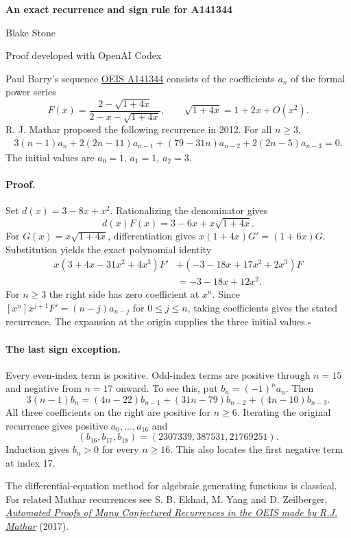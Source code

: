 \documentclass[11pt,letterpaper]{article}
\begin{document}
\begin{center}
{\LARGE\bfseries An exact recurrence and sign rule for A141344}\par\vspace{9pt}
Blake Stone\par{\small Proof developed with OpenAI Codex}
\end{center}
Paul Barry's sequence \href{https://oeis.org/A141344}{OEIS A141344} consists of the coefficients $a_n$ of the formal power series
\[
 F(x)=\frac{2-\sqrt{1+4x}}{2-x-\sqrt{1+4x}},\qquad \sqrt{1+4x}=1+2x+O(x^2).
\]
R. J. Mathar proposed the following recurrence in 2012. For all $n\ge3$,
\[
\begin{aligned}
 3(n-1)a_n+2(2n-11)a_{n-1}
    +(79-31n)a_{n-2}+2(2n-5)a_{n-3}=0.
\end{aligned}
\]
The initial values are $a_0=1$, $a_1=1$, $a_2=3$.

\paragraph{Proof.} Set $d(x)=3-8x+x^2$. Rationalizing the denominator gives
\[
 d(x)F(x)=3-6x+x\sqrt{1+4x}.
\]
For $G(x)=x\sqrt{1+4x}$, differentiation gives $x(1+4x)G'=(1+6x)G$. Substitution yields the exact polynomial identity
\[
\begin{aligned}
 x(3+4x-31x^2+4x^3)F' &+(-3-18x+17x^2+2x^3)F\\
   &=-3-18x+12x^2 .
\end{aligned}
\]
For $n\ge3$ the right side has zero coefficient at $x^n$. Since $[x^n]x^{j+1}F'=(n-j)a_{n-j}$ for $0\le j\le n$, taking coefficients gives the stated recurrence. The expansion at the origin supplies the three initial values.\hfill$\square$

\paragraph{The last sign exception.} Every even-index term is positive. Odd-index terms are positive through $n=15$ and negative from $n=17$ onward. To see this, put $b_n=(-1)^n a_n$. Then
\[
 3(n-1)b_n=(4n-22)b_{n-1}+(31n-79)b_{n-2}+(4n-10)b_{n-3}.
\]
All three coefficients on the right are positive for $n\ge6$. Iterating the original recurrence gives positive $a_0,\ldots,a_{16}$ and
\[
 (b_{16},b_{17},b_{18})=(2307339,387531,21769251).
\]
Induction gives $b_n>0$ for every $n\ge16$. This also locates the first negative term at index 17.

\vfill
\small The differential-equation method for algebraic generating functions is classical. For related Mathar recurrences see S. B. Ekhad, M. Yang and D. Zeilberger, \href{https://sites.math.rutgers.edu/~zeilberg/mamarim/mamarimhtml/mathar.html}{\emph{Automated Proofs of Many Conjectured Recurrences in the OEIS made by R.J. Mathar}} (2017).
\end{document}
